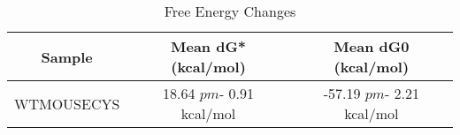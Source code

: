 \documentclass{article}
\begin{document}
\begin{table}[ht]
    \centering
    \begin{tabular}{|c|c|c|}
    \hline
    Sample & Mean dG* (kcal/mol) & Mean dG0 (kcal/mol) \\
    \hline
    WTMOUSECYS & 18.64 $pm$- 0.91 kcal/mol & -57.19 $pm$- 2.21 kcal/mol \\
    \hline
    \end{tabular}
    \caption{Free Energy Changes}
\end{table}
\end{document}

